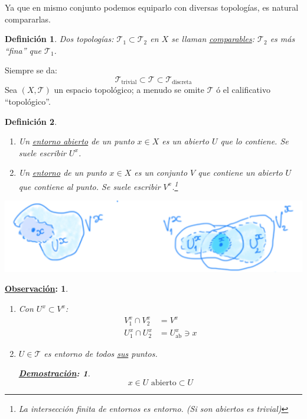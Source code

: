 \documentclass[10pt,a4paper,openright]{book}
\theoremstyle{break}
\newtheorem*{defi}{Definición}
\newtheorem*{demo}{\underline{Demostración}:}
\newtheorem*{obs}{\underline{Observación}:}
\begin{document}
Ya que en mismo conjunto podemos equiparlo con diversas topologías, es natural compararlas.
\begin{defi}
Dos topologías: $\mathcal{T}_1 \subset \mathcal{T}_2$ en $X$ se llaman \underline{comparables}: $\mathcal{T}_2$ es más ``fina'' que $\mathcal{T}_1$.
\end{defi}
Siempre se da:
\[
\mathcal{T}_{\text{trivial}} \subset \mathcal{T} \subset \mathcal{T}_{\text{discreta}} 
\]
Sea $\left( X, \mathcal{T} \right)$ un espacio topológico; a menudo se omite $\mathcal{T}$ ó el calificativo ``topológico''. 

\begin{defi}
\begin{enumerate}
    \item Un \underline{entorno abierto} de un punto $x \in X$ es un abierto $U$ que lo contiene. Se suele escribir $U^x$.
    \item Un \underline{entorno} de un punto $x \in X$ es un conjunto $V$ que contiene un abierto $U$ que contiene al punto. Se suele escribir $V^x$.\footnote{La intersección finita de entornos es entorno. (Si son abiertos es trivial)}
\end{enumerate}
\end{defi}
\begin{center}
    \includegraphics[scale=0.2]{images/def_entornos} 
\end{center}
\begin{obs}    
\begin{enumerate}
    \item Con $U^x \subset V^x$:
    \begin{align*}
        V_1^x \cap V_2^x &= V^x\\
        U_1^x \cap U_2^x &= U_{\text{ab}}^x \ni x
    \end{align*}

    \item $U \in \mathcal{T}$ es entorno de todos \underline{sus} puntos.
    \begin{demo}
    \[
    x \in U \text{ abierto} \subset U
    \]
    \end{demo}
\end{enumerate}
\end{obs}
\end{document}
